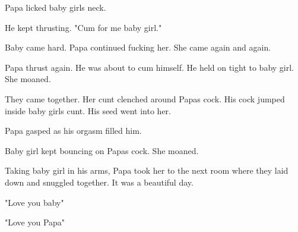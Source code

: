      Papa licked baby girls neck.

     He kept thrusting. "Cum for me baby girl."

     Baby came hard. Papa continued fucking her. She came again and again.

     Papa thrust again. He was about to cum  himself. He held on tight to baby girl. She moaned. 

    They came together. Her cunt clenched around Papas cock. His cock jumped inside baby girls cunt. His seed went into her. 

     Papa gasped as his orgasm filled him.

     Baby girl kept bouncing on Papas cock.  She moaned. 

     Taking baby girl in his arms, Papa took her to the next room where they laid down and snuggled together. It was a beautiful day.

     "Love you baby"

     "Love you Papa"

